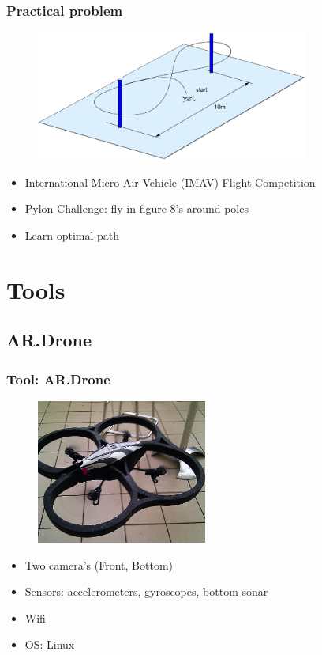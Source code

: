 \documentclass{beamer}
\begin{document}
\begin{frame}
  \frametitle{Practical problem}
  \begin{figure}
    \includegraphics[width=0.8\textwidth]{img/8}
  \end{figure}
  \begin{itemize}
    \item International Micro Air Vehicle (IMAV) Flight Competition
    \item Pylon Challenge: fly in figure 8's around poles
    \item Learn optimal path
  \end{itemize}
\end{frame}

\section{Tools}

\subsection{AR.Drone}
\begin{frame}
  \frametitle{Tool: AR.Drone}
  \begin{figure}
    \includegraphics[width=0.5\textwidth]{img/ARDRONE}
  \end{figure}
  \begin{itemize}
    \item Two camera's (Front, Bottom)
    \item Sensors: accelerometers, gyroscopes, bottom-sonar
    \item Wifi
    \item OS: Linux
  \end{itemize}
\end{frame}
\end{document}
